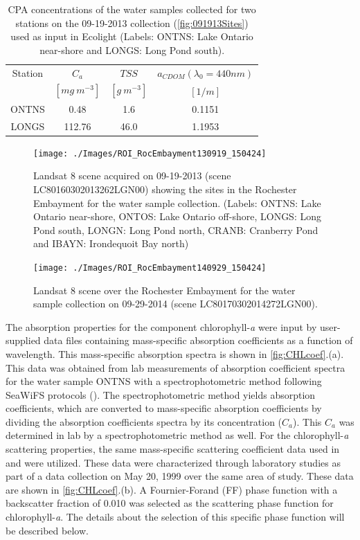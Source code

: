 \documentclass[onecolumn,3p,letterpaper]{elsarticle}
\begin{document}
\begin{table}[htbp!]
\caption{ CPA concentrations of the water samples collected for two stations on the 09-19-2013 collection (\autoref{fig:091913Sites}) used as input in Ecolight (Labels: ONTNS: Lake Ontario near-shore and LONGS: Long Pond south). \label{tab:ONTNSconc} } 
\small
\centering
\begin{tabular}{c|c|c|c} 
 Station & \bfseries{$C_a$} & \bfseries{$TSS$} & \bfseries{$a_{CDOM}(\lambda_0=440nm)$}\\
 & $[mg~m^{-3}]$ & $[g~m^{-3}]$ & $[1/m]$ \\ \hline \hline
ONTNS & 0.48   & 1.6  & 0.1151 \\ 
LONGS & 112.76 & 46.0 & 1.1953 \\ 
 \end{tabular}
\end{table}

\begin{figure}[htb]
  \centering
  \texttt{[image: ./Images/ROI\_RocEmbayment130919\_150424]}
  \caption{Landsat 8 scene acquired on 09-19-2013 (scene LC80160302013262LGN00) showing the sites in the Rochester Embayment for the water sample collection. (Labels: ONTNS: Lake Ontario near-shore, ONTOS: Lake Ontario off-shore, LONGS: Long Pond south, LONGN: Long Pond north, CRANB: Cranberry Pond and IBAYN: Irondequoit Bay north)\label{fig:091913Sites} } 
\end{figure}

\begin{figure}[htb]
  \centering
  \texttt{[image: ./Images/ROI\_RocEmbayment140929\_150424]}
  \caption{Landsat 8 scene over the Rochester Embayment for the water sample collection on 09-29-2014 (scene LC80170302014272LGN00).\label{fig:092914Sites} } 
\end{figure}

The absorption properties for the component chlorophyll-{\it a} were input by user-supplied data files containing mass-specific absorption coefficients as a function of wavelength. This mass-specific absorption spectra is shown in \autoref{fig:CHLcoef}.(a). This data was obtained from lab measurements of absorption coefficient spectra for the water sample ONTNS with a spectrophotometric method following SeaWiFS protocols (\cite{Mueller1995}). The spectrophotometric method yields absorption coefficients, which are converted to mass-specific absorption coefficients by dividing the absorption coefficients spectra by its concentration ($C_a$). This $C_a$ was determined in lab by a spectrophotometric method as well. For the chlorophyll-{\it a} scattering properties, the same mass-specific scattering coefficient data used in \cite{Raqueno:2000} and \cite{Raqueno:2003} were utilized. These data were characterized through laboratory studies as part of a data collection on May 20, 1999 over the same area of study. These data are shown in \autoref{fig:CHLcoef}.(b). A Fournier-Forand (FF) phase function with a backscatter fraction of 0.010 was selected as the scattering phase function for chlorophyll-{\it a}. The details about the selection of this specific phase function will be described below.
\end{document}
